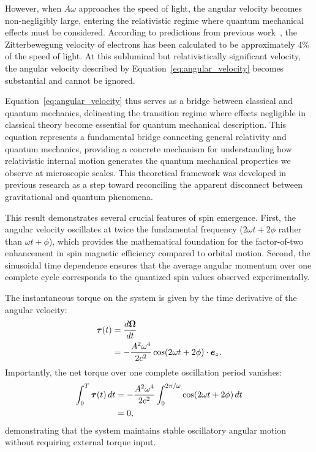 \documentclass[%
 reprint,
 amsmath,amssymb,
 aps,
]{revtex4-1}
\numberwithin{equation}{section}%
\begin{document}
However, when $A\omega$ approaches the speed of light, the angular velocity becomes non-negligibly large, entering the relativistic regime where quantum mechanical effects must be considered. According to predictions from previous work~\cite{hanamura2501.0130}, the Zitterbewegung velocity of electrons has been calculated to be approximately 4\% of the speed of light. At this subluminal but relativistically significant velocity, the angular velocity described by Equation~\eqref{eq:angular_velocity} becomes substantial and cannot be ignored.

Equation~\eqref{eq:angular_velocity} thus serves as a bridge between classical and quantum mechanics, delineating the transition regime where effects negligible in classical theory become essential for quantum mechanical description. This equation represents a fundamental bridge connecting general relativity and quantum mechanics, providing a concrete mechanism for understanding how relativistic internal motion generates the quantum mechanical properties we observe at microscopic scales. This theoretical framework was developed in previous research as a step toward reconciling the apparent disconnect between gravitational and quantum phenomena.

This result demonstrates several crucial features of spin emergence. First, the angular velocity oscillates at twice the fundamental frequency ($2\omega t + 2\phi$ rather than $\omega t + \phi$), which provides the mathematical foundation for the factor-of-two enhancement in spin magnetic efficiency compared to orbital motion. Second, the sinusoidal time dependence ensures that the average angular momentum over one complete cycle corresponds to the quantized spin values observed experimentally.

The instantaneous torque on the system is given by the time derivative of the angular velocity:
\begin{align}
\boldsymbol{\tau}(t) 
&= \frac{d\boldsymbol{\Omega}}{dt} \notag\\
&= -\frac{A^2\omega^4}{2c^2} \cos(2\omega t + 2\phi) \cdot \boldsymbol{e}_z. \label{eq:instantaneous_torque}
\end{align}
Importantly, the net torque over one complete oscillation period vanishes:
\begin{align}
\int_0^{T} \boldsymbol{\tau}(t) \, dt 
&= -\frac{A^2\omega^4}{2c^2} \int_0^{2\pi/\omega} \cos(2\omega t + 2\phi) \, dt \notag\\
&= 0, \label{eq:zero_net_torque}
\end{align}
demonstrating that the system maintains stable oscillatory angular motion without requiring external torque input.
\end{document}
